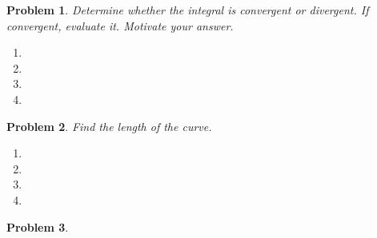 \documentclass{article}
\renewcommand{\fcProblemRef}{\theproblem.\theenumi}
\newtheorem{problem}{Problem}
\begin{document}
\begin{problem} Determine whether the integral is convergent or divergent. If convergent, evaluate it. Motivate your answer.

\begin{multicols}{2}
\begin{enumerate}[ref={\fcProblemRef}]
\item 
\item 
\item 
\item 
\end{enumerate}
\end{multicols}
\end{problem}

\begin{problem}Find the length of the curve.
\begin{enumerate}[ref={\fcProblemRef}]
\item 
\item 
\item 
\item 
\end{enumerate}
\end{problem}



\begin{problem}


\end{problem}




%
%
\end{document}
